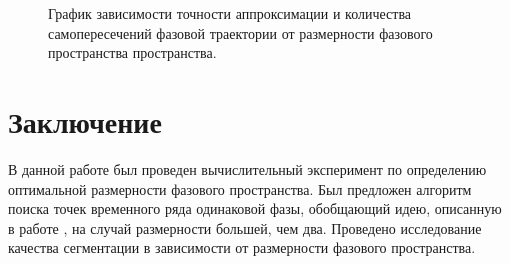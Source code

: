 \documentclass[12pt, twoside]{article}
\theoremstyle{definition}
\begin{document}
    
    \begin{figure}[ht]\label{fig7}
	    \caption{График зависимости точности аппроксимации и количества самопересечений фазовой траектории от размерности фазового пространства пространства.}
    \end{figure}
    
    
\newpage






\section{Заключение}
 В данной работе был проведен вычислительный эксперимент по определению оптимальной размерности фазового пространства. Был предложен алгоритм поиска точек временного ряда одинаковой фазы, обобщающий идею, описанную в работе \cite{motrenko2015extracting}, на случай размерности большей, чем два. Проведено исследование качества сегментации в зависимости от размерности фазового пространства.
\end{document}

